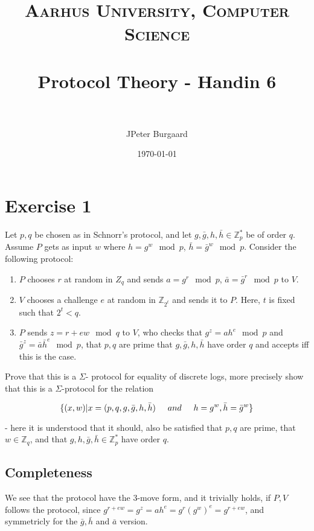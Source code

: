 \documentclass[paper=a4, fontsize=11pt]{scrartcl} %
\title{	
	\normalfont \normalsize 
	\textsc{Aarhus University, Computer Science} \\ [25pt] %
	\horrule{0.5pt} \\[0.4cm] %
	\huge Protocol Theory - Handin 6 \\ %
	\horrule{2pt} \\[0.5cm] %
}
\author{JPeter Burgaard} %
\date{\normalsize\today} %
\numberwithin{equation}{section} %
\numberwithin{figure}{section} %
\numberwithin{table}{section} %
\begin{document}
	
	\maketitle %
	
	\section{Exercise 1}
	
	Let $p,q$ be chosen as in Schnorr's protocol, and let $g,\bar{g},h,\bar{h}\in\mathbb{Z}_p^*$ be of order $q$. Assume $P$ gets as input $w$ where $h=g^w\mod{p}$, $\bar{h}=\bar{g}^w\mod{p}$. Consider the following protocol:
	
	\begin{enumerate}
		\item $P$ chooses $r$ at random in $Z_q$ and sends $a=g^r\mod{p}$, $\bar{a}=\bar{g}^r\mod{p}$ to $V$.
		\item $V$ chooses a challenge $e$ at random in $\mathbb{Z}_{2^t}$ and sends it to $P$. Here, $t$ is fixed such that $2^t<q$. 
		\item $P$ sends $z=r+ew\mod{q}$ to $V$, who checks that $g^z=ah^e\mod{p}$ and $\bar{g}^z=\bar{a}\bar{h}^e\mod{p}$, that $p,q$ are prime that $g,\bar{g},h,\bar{h}$ have order $q$ and accepts iff this is the case.
	\end{enumerate}
	
	Prove that this is a $\Sigma$- protocol for equality of discrete logs, more precisely show that this is a $\Sigma$-protocol for the relation 
	
	$$\{(x,w)|x=(p,q,g,\bar{g},h,\bar{h}) \hspace{0.5cm} and \hspace{0.5cm} h=g^w, \bar{h}=\bar{g}^w\}$$
	
	- here it is understood that it should, also be satisfied that $p,q$ are prime, that $w\in\mathbb{Z}_q$, and that $g,h,\bar{g},\bar{h}\in\mathbb{Z}_p^*$ have order $q$. \\
	
	\subsection*{Completeness}
	
	We see that the protocol have the 3-move form, and it trivially holds, if $P,V$ follows the protocol, since $g^{r+ew}=g^z=ah^e=g^r(g^{w})^e=g^{r+ew}$, and symmetricly for the $\bar{g}, \bar{h}$ and $\bar{a}$ version.
	
\end{document}

